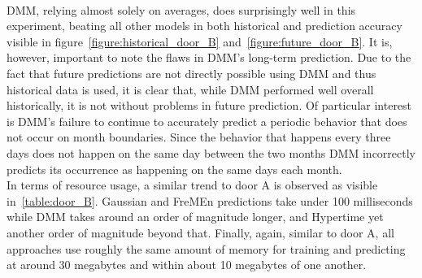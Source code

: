 \begin{table}[h!]
  \centering
  \caption{Door B Data Overview}
  \label{table:door_B}
\end{table} \\

DMM, relying almost solely on averages, does surprisingly well in this
experiment, beating all other models in both historical and prediction
accuracy visible in figure~\ref{figure:historical_door_B} and~\ref{figure:future_door_B}. It is, however, important to note the flaws in DMM's long-term
prediction. Due to the fact that future predictions are not directly possible
using DMM and thus historical data is used, it is clear that,
while DMM performed well overall historically, it is not without problems
in future prediction. Of particular interest is DMM's failure to continue to
accurately predict a periodic behavior that does not occur on month
boundaries. Since the behavior that happens every three days does not happen
on the same day between the two months DMM incorrectly predicts its
occurrence as happening on the same days each month. \\

In terms of resource usage, a similar trend to door A is observed as visible
in~\ref{table:door_B}. Gaussian
and FreMEn predictions take under 100 milliseconds while DMM takes around
an order of magnitude longer, and Hypertime yet another order of magnitude
beyond that. Finally, again, similar to door A, all approaches use roughly the same amount
of memory for training and predicting at around 30 megabytes and
within about 10 megabytes of one another. \\

